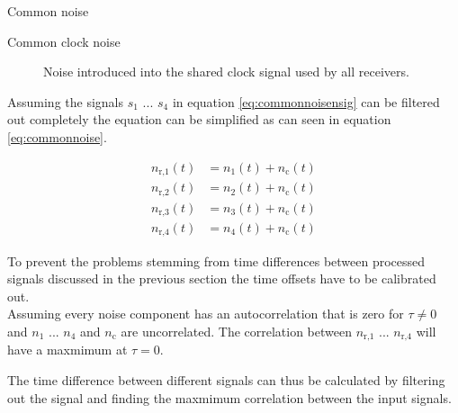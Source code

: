 \begin{subchapter}{Common noise}
\begin{description}
    \item[Common clock noise]
      Noise introduced into the shared clock signal used by all
      receivers.
  \end{description}

  Assuming the signals $s_\text{1}$ ... $s_\text{4}$ in equation
  \ref{eq:commonnoisensig} can be filtered out completely the equation
  can be simplified as can seen in equation \ref{eq:commonnoise}.

  \begin{align}
    \label{eq:commonnoise}
    n_\text{r,1}(t) &= n_\text{1}(t) + n_\text{c}(t) \\
    n_\text{r,2}(t) &= n_\text{2}(t) + n_\text{c}(t) \nonumber \\
    n_\text{r,3}(t) &= n_\text{3}(t) + n_\text{c}(t) \nonumber \\
    n_\text{r,4}(t) &= n_\text{4}(t) + n_\text{c}(t) \nonumber
  \end{align}

  To prevent the problems stemming from time differences between processed
  signals discussed in the previous section the time offsets have
  to be calibrated out. \\

  Assuming every noise component has an autocorrelation that is zero
  for $\tau \neq 0$ and $n_\text{1}$ ... $n_\text{4}$ and $n_\text{c}$
  are uncorrelated. The correlation between
  $n_\text{r,1}$ ... $n_\text{r,4}$ will have a maxmimum at $\tau = 0$.

  The time difference between different signals can thus be
  calculated by filtering out the signal and finding the
  maxmimum correlation between the input signals.
\end{subchapter}
